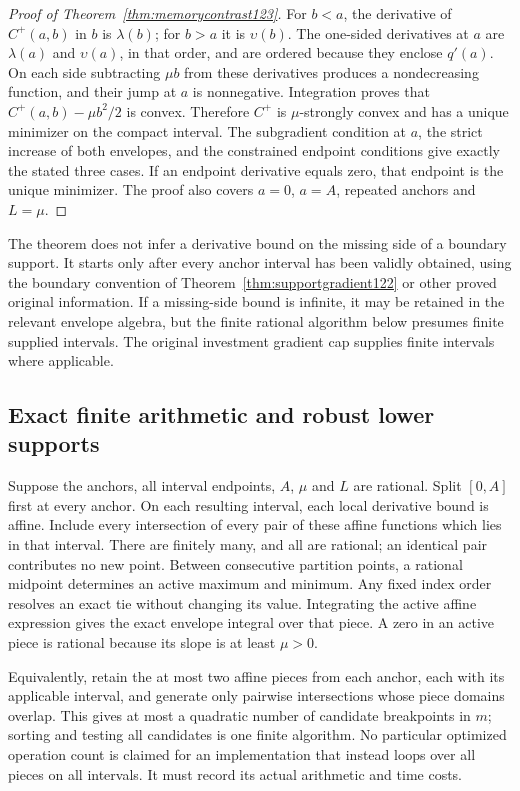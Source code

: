 \begin{proof}[Proof of Theorem~\ref{thm:memorycontrast123}]
For $b<a$, the derivative of $C^+(a,b)$ in $b$ is
$\lambda(b)$; for $b>a$ it is $\upsilon(b)$. The one-sided
derivatives at $a$ are $\lambda(a)$ and $\upsilon(a)$, in that
order, and are ordered because they enclose $q'(a)$. On each
side subtracting $\mu b$ from these derivatives produces a
nondecreasing function, and their jump at $a$ is nonnegative.
Integration proves that $C^+(a,b)-\mu b^2/2$ is convex.
Therefore $C^+$ is $\mu$-strongly convex and has a unique minimizer
on the compact interval. The subgradient condition at $a$, the
strict increase of both envelopes, and the constrained endpoint
conditions give exactly the stated three cases. If an endpoint
derivative equals zero, that endpoint is the unique minimizer.
The proof also covers $a=0$, $a=A$, repeated anchors and $L=\mu$.
\end{proof}

The theorem does not infer a derivative bound on the missing side of
a boundary support. It starts only after every anchor interval has
been validly obtained, using the boundary convention of
Theorem~\ref{thm:supportgradient122} or other proved original
information. If a missing-side bound is infinite, it may be retained
in the relevant envelope algebra, but the finite rational algorithm
below presumes finite supplied intervals. The original investment
gradient cap supplies finite intervals where applicable.

\subsection{Exact finite arithmetic and robust lower supports}

Suppose the anchors, all interval endpoints, $A$, $\mu$ and $L$
are rational. Split $[0,A]$ first at every anchor. On each resulting
interval, each local derivative bound is affine. Include every
intersection of every pair of these affine functions which lies in
that interval. There are finitely many, and all are rational; an
identical pair contributes no new point. Between consecutive
partition points, a rational midpoint determines an active maximum
and minimum. Any fixed index order resolves an exact tie without
changing its value. Integrating the active affine expression gives
the exact envelope integral over that piece. A zero in an active
piece is rational because its slope is at least $\mu>0$.

Equivalently, retain the at most two affine pieces from each anchor,
each with its applicable interval, and generate only pairwise
intersections whose piece domains overlap. This gives at most a
quadratic number of candidate breakpoints in $m$; sorting and testing
all candidates is one finite algorithm. No particular optimized
operation count is claimed for an implementation that instead
loops over all pieces on all intervals. It must record its actual
arithmetic and time costs.

